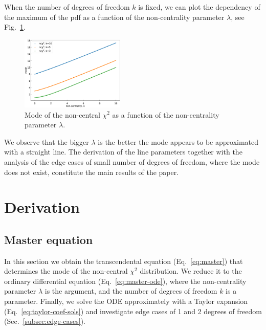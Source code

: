 \documentclass[final,5p,twocolumn,times,authoryear]{elsarticle}
\begin{document}
When the number of degrees of freedom $k$ is fixed, we can plot the dependency of the maximum of the pdf as a function of the non-centrality parameter $\lambda$, see Fig.~\ref{fig:ncx2-max}.

\begin{figure}[h]
	\centering
 	\includegraphics[width=0.44\textwidth]{ncx2-max.eps}
	\caption{Mode of the non-central $\chi^2$ as a function of the non-centrality parameter $\lambda$.}\label{fig:ncx2-max}
\end{figure}

We observe that the bigger $\lambda$ is the better the mode appears to be approximated with a straight line. The derivation of the line parameters together with the analysis of the edge cases of small number of degrees of freedom, where the mode does not exist, constitute the main results of the paper.

\section{Derivation}

\subsection{Master equation}
In this section we obtain the transcendental equation (Eq.~\ref{eq:master}) that determines the mode of the non-central $\chi^2$ distribution. We reduce it to the ordinary differential equation (Eq.~\ref{eq:master-ode}), where the non-centrality parameter $\lambda$ is the argument, and the number of degrees of freedom $k$ is a parameter. Finally, we solve the ODE approximately with a Taylor expansion (Eq.~\ref{eq:taylor-coef-sols}) and investigate edge cases of 1 and 2 degrees of freedom (Sec.~\ref{subsec:edge-cases}).
\end{document}
